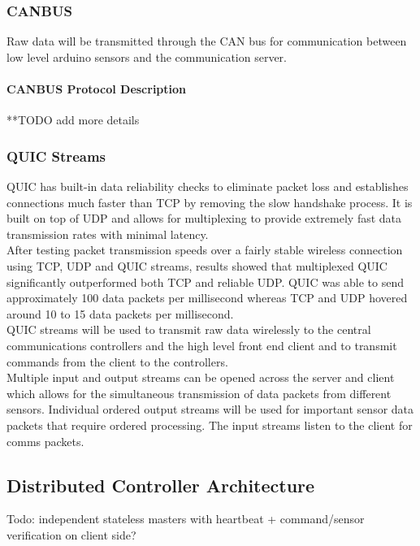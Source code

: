 \documentclass[main.tex]{subfiles}
\begin{document}
    \subsubsection{CANBUS}
    Raw data will be transmitted through the CAN bus for communication between low level arduino sensors and the communication server.
    \paragraph{CANBUS Protocol Description}
    **TODO add more details
    \subsubsection{QUIC Streams}
    QUIC has built-in data reliability checks to eliminate packet loss and establishes connections much faster than TCP by removing the slow handshake process. It is built on top of UDP and allows for multiplexing to provide extremely fast data transmission rates with minimal latency.\\
    After testing packet transmission speeds over a fairly stable wireless connection using TCP, UDP and QUIC streams, results showed that multiplexed QUIC significantly outperformed both TCP and reliable UDP. QUIC was able to send approximately 100 data packets per millisecond whereas TCP and UDP hovered around 10 to 15 data packets per millisecond.\\
    QUIC streams will be used to transmit raw data wirelessly to the central communications controllers and the high level front end client and to transmit commands from the client to the controllers.\\
    Multiple input and output streams can be opened across the server and client which allows for the simultaneous transmission of data packets from different sensors. Individual ordered output streams will be used for important sensor data packets that require ordered processing. The input streams listen to the client for comms packets.
    \subsection{Distributed Controller Architecture}
    Todo: independent stateless masters with heartbeat + command/sensor verification on client side?
\end{document}

